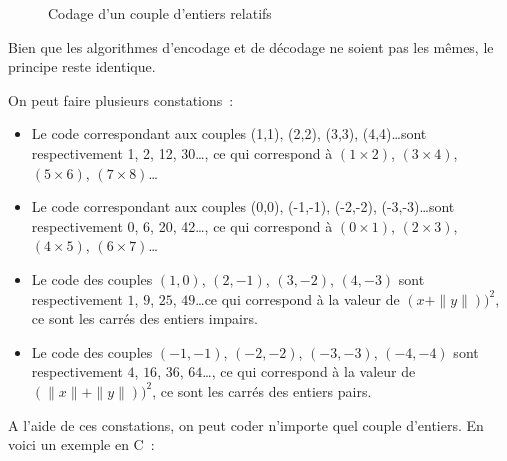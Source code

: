 \documentclass{article}
\begin{document}
\begin{figure}[h!]
  \caption{Codage d'un couple d'entiers relatifs}
  \label{fig:codage-rel}
\end{figure}

Bien que les algorithmes d'encodage et de décodage ne soient pas les mêmes, le principe reste identique. 

On peut faire plusieurs constations~:

\begin{itemize}
\item Le code correspondant aux couples (1,1), (2,2), (3,3), (4,4)\ldots sont respectivement 1, 2, 12, 30\ldots, ce qui correspond à $(1 \times 2)$, $(3 \times 4)$, $(5 \times 6)$, $(7 \times 8)$\ldots
\item Le code correspondant aux couples (0,0), (-1,-1), (-2,-2), (-3,-3)\ldots sont respectivement 0, 6, 20, 42\ldots, ce qui correspond à $(0 \times 1)$, $(2 \times 3)$, $(4 \times 5)$, $(6 \times 7)$\ldots
\item Le code des couples $(1,0)$, $(2,-1)$, $(3,-2)$, $(4,-3)$ sont respectivement $1$, $9$, $25$, $49$\ldots ce qui correspond à la valeur de $(x + \|y\|))^{2}$, ce sont les carrés des entiers impairs.
\item Le code des couples $(-1,-1)$, $(-2,-2)$, $(-3,-3)$, $(-4,-4)$ sont respectivement $4$, $16$, $36$, $64$\ldots,  ce qui correspond à la valeur de $(\|x\| + \|y\|))^{2}$, ce sont les carrés des entiers pairs.
\end{itemize}


A l'aide de ces constations, on peut coder n'importe quel couple d'entiers. En voici un exemple en C~:
\end{document}
